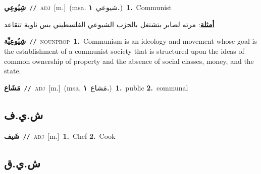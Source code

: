 \documentclass[10pt,a4paper,twoside]{article} %
\begin{document}
\begin{multicols}{2}
{\setlength\topsep{0pt}\textbf{\foreignlanguage{arabic}{شِيُوعِي}}\ {\color{gray}\texttt{//}\color{black}}\ \textsc{adj}\ [m.]\ \color{gray}(msa. \foreignlanguage{arabic}{شيوعي}~\foreignlanguage{arabic}{\textbf{١.}})\color{black}\ \textbf{1.}~Communist\  \begin{flushright}\color{gray}\foreignlanguage{arabic}{\textbf{\underline{\foreignlanguage{arabic}{أمثلة}}}: مرته لصابر بتشتغل بالحزب الشيوعي الفلسطيني بس ناوية تتقاعد}\end{flushright}\color{black}} \vspace{2mm}

{\setlength\topsep{0pt}\textbf{\foreignlanguage{arabic}{شِيُوعِيِّة}}\ {\color{gray}\texttt{//}\color{black}}\ \textsc{noun\textunderscore prop}\ \textbf{1.}~Communism is an ideology and movement whose goal is the establishment of a communist society that is structured upon the ideas of common ownership of property and the absence of social classes, money, and the state.\ } \vspace{2mm}

{\setlength\topsep{0pt}\textbf{\foreignlanguage{arabic}{مَشَاع}}\ {\color{gray}\texttt{//}\color{black}}\ \textsc{adj}\ [m.]\ \color{gray}(msa. \foreignlanguage{arabic}{مَشاع}~\foreignlanguage{arabic}{\textbf{١.}})\color{black}\ \textbf{1.}~public  \textbf{2.}~communal\ } \vspace{2mm}

\vspace{-3mm}
\subsection*{\color{blue}\foreignlanguage{arabic}{ش.ي.ف}\color{blue}{ (ntws)}} 

{\setlength\topsep{0pt}\textbf{\foreignlanguage{arabic}{شَيف}}\ {\color{gray}\texttt{//}\color{black}}\ \textsc{adj}\ [m.]\ \textbf{1.}~Chef  \textbf{2.}~Cook\ } \vspace{2mm}

\vspace{-3mm}
\subsection*{\color{blue}\foreignlanguage{arabic}{ش.ي.ق}\color{blue}{}} 


\end{multicols}
\end{document}
